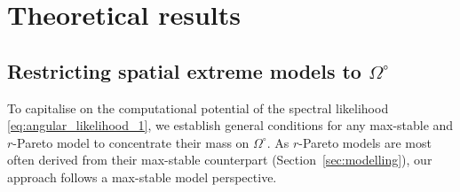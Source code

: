 \documentclass[12pt]{article}
\begin{document}
\section{Theoretical results}
\label{sec:theory}

\subsection{Restricting spatial extreme models to $\Omega^\circ$}

To capitalise on the computational potential of the spectral likelihood \eqref{eq:angular_likelihood_1}, we establish general conditions for any max-stable and $r$-Pareto model to concentrate their mass on $\Omega^\circ$. As 
$r$-Pareto models are most often derived from their max-stable counterpart (Section~\ref{sec:modelling}), our approach follows a max-stable model perspective.
\end{document}
